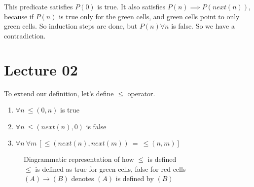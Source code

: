 \documentclass[a4paper,10pt]{article}
\theoremstyle{definition} %
\begin{document}
    This predicate satisfies $P(0)$ is true. It also satisfies $P(n) \implies P(next(n))$,
    because if $P(n)$ is true only for the green cells, and green cells point to only green cells.
    So induction steps are done, but $P(n) \forall n$ is false. So we have a contradiction.

    \section{Lecture 02}

    To extend our definition, let's define $\leq$ operator.

    \begin{tcolorbox}[colback=blue!10!white, colframe=blue!50!black]
        \begin{enumerate}
            \item $\forall n \ \leq(0, n)$ is true
            \item $\forall n \ \leq(next(n), 0)$ is false
            \item $\forall n \  \forall m \ [\leq(next(n), next(m))\ = \ \leq(n, m)]$
        \end{enumerate}
    \end{tcolorbox}

    \begin{figure}[ht]
    \centering
    \captionsetup{justification=centering}  %
    \caption{Diagrammatic representation of how $\leq$ is defined \\
    $\leq$ is defined as true for green cells, false for red cells \\
    $(A) \rightarrow (B)$ denotes $(A)$ is defined by $(B)$}
    \end{figure}
\end{document}
